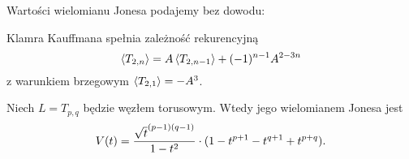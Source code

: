Wartości wielomianu Jonesa podajemy bez dowodu:

\begin{proposition}
%
    Klamra Kauffmana spełnia zależność rekurencyjną
    \begin{equation}
        \left\langle{T_{2, n}}\right\rangle = A \left\langle{T_{2,n-1}}\right\rangle + (-1)^{n-1} A^{2-3n}
    \end{equation}
    z warunkiem brzegowym $\left\langle{T_{2,1}}\right\rangle = -A^3$.
\end{proposition}

\begin{proposition}
%
    Niech $L = T_{p, q}$ będzie węzłem torusowym.
    Wtedy jego wielomianem Jonesa jest
    \begin{equation}
        V(t) = \frac {{\sqrt t}^{(p-1)(q-1)}}{1-t^2} \cdot (1 - t^{p+1} - t^{q+1} + t^{p+q}).
    \end{equation}
\end{proposition}

